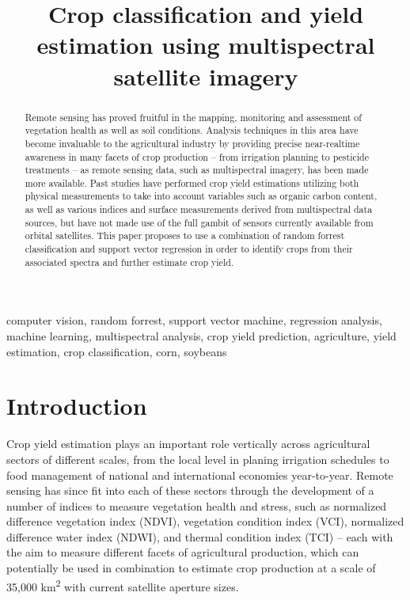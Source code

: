 \documentclass[conference]{IEEEtran}
\begin{document}
\title{Crop classification and yield estimation using multispectral satellite imagery}

\author{
}

\maketitle

\begin{abstract}
Remote sensing has proved fruitful in the mapping, monitoring and assessment of vegetation health as well as soil conditions.  Analysis techniques in this area have become invaluable to the agricultural industry by providing precise near-realtime awareness in many facets of crop production -- from irrigation planning to pesticide treatments -- as remote sensing data, such as multispectral imagery, has been made more available.  Past studies have performed crop yield estimations utilizing both physical measurements to take into account variables such as organic carbon content, as well as various indices and surface measurements derived from multispectral data sources, but have not made use of the full gambit of sensors currently available from orbital satellites. This paper proposes to use a combination of random forrest classification and support vector regression in order to identify crops from their associated spectra and further estimate crop yield.
\end{abstract}

\begin{IEEEkeywords}
computer vision, random forrest, support vector machine, regression analysis, machine learning, multispectral analysis, crop yield prediction, agriculture, yield estimation, crop classification, corn, soybeans
\end{IEEEkeywords}

\section{Introduction}
Crop yield estimation plays an important role vertically across agricultural sectors of different scales, from the local level in planing irrigation schedules to food management of national and international economies year-to-year.\cite{01431169608949138}  Remote sensing has since fit into each of these sectors through the development of a number of indices to measure vegetation health and stress, such as normalized difference vegetation index (NDVI), vegetation condition index (VCI), normalized difference water index (NDWI), and thermal condition index (TCI) -- each with the aim to measure different facets of agricultural production, which can potentially be used in combination to estimate crop production at a scale of 35,000 km\textsuperscript{2} with current satellite aperture sizes.
\end{document}
